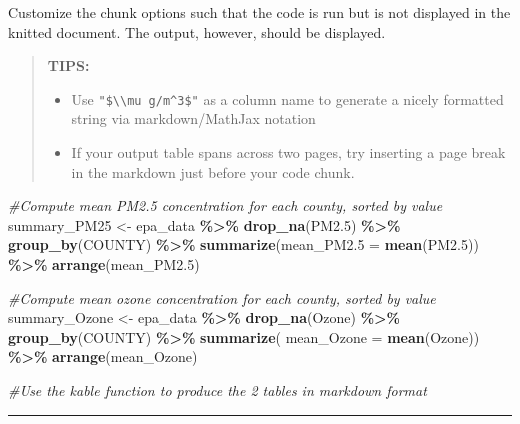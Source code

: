 \documentclass[
]{article}
\newenvironment{Shaded}{\begin{snugshade}}{\end{snugshade}}
\newcommand{\AttributeTok}[1]{\textcolor[rgb]{0.13,0.29,0.53}{#1}}
\newcommand{\CommentTok}[1]{\textcolor[rgb]{0.56,0.35,0.01}{\textit{#1}}}
\newcommand{\FloatTok}[1]{\textcolor[rgb]{0.00,0.00,0.81}{#1}}
\newcommand{\FunctionTok}[1]{\textcolor[rgb]{0.13,0.29,0.53}{\textbf{#1}}}
\newcommand{\NormalTok}[1]{#1}
\newcommand{\OtherTok}[1]{\textcolor[rgb]{0.56,0.35,0.01}{#1}}
\newcommand{\SpecialCharTok}[1]{\textcolor[rgb]{0.81,0.36,0.00}{\textbf{#1}}}
\begin{document}
Customize the chunk options such that the code is run but is not
displayed in the knitted document. The output, however, should be
displayed.

\begin{quote}
\textbf{TIPS:}

\begin{itemize}
\item
  Use \texttt{"\$\textbackslash{}\textbackslash{}mu\ g/m\^{}3\$"} as a
  column name to generate a nicely formatted string via markdown/MathJax
  notation
\item
  If your output table spans across two pages, try inserting a page
  break in the markdown just before your code chunk.
\end{itemize}
\end{quote}

\begin{Shaded}
\begin{Highlighting}[]
\CommentTok{\#Compute mean PM2.5 concentration for each county, sorted by value}
\NormalTok{summary\_PM25 }\OtherTok{\textless{}{-}}\NormalTok{ epa\_data }\SpecialCharTok{\%\textgreater{}\%} 
  \FunctionTok{drop\_na}\NormalTok{(PM2}\FloatTok{.5}\NormalTok{) }\SpecialCharTok{\%\textgreater{}\%} 
  \FunctionTok{group\_by}\NormalTok{(COUNTY) }\SpecialCharTok{\%\textgreater{}\%} 
  \FunctionTok{summarize}\NormalTok{(}\AttributeTok{mean\_PM2.5 =} \FunctionTok{mean}\NormalTok{(PM2}\FloatTok{.5}\NormalTok{)) }\SpecialCharTok{\%\textgreater{}\%} 
  \FunctionTok{arrange}\NormalTok{(mean\_PM2}\FloatTok{.5}\NormalTok{)}

\CommentTok{\#Compute mean ozone concentration for each county, sorted by value}
\NormalTok{summary\_Ozone }\OtherTok{\textless{}{-}}\NormalTok{ epa\_data }\SpecialCharTok{\%\textgreater{}\%} 
  \FunctionTok{drop\_na}\NormalTok{(Ozone) }\SpecialCharTok{\%\textgreater{}\%} 
  \FunctionTok{group\_by}\NormalTok{(COUNTY) }\SpecialCharTok{\%\textgreater{}\%} 
  \FunctionTok{summarize}\NormalTok{(}
    \AttributeTok{mean\_Ozone =} \FunctionTok{mean}\NormalTok{(Ozone)) }\SpecialCharTok{\%\textgreater{}\%} 
  \FunctionTok{arrange}\NormalTok{(mean\_Ozone)}

\CommentTok{\#Use the \textasciigrave{}kable\textasciigrave{} function to produce the 2 tables in markdown format}
\end{Highlighting}
\end{Shaded}

\begin{center}\rule{0.5\linewidth}{0.5pt}\end{center}
\end{document}
